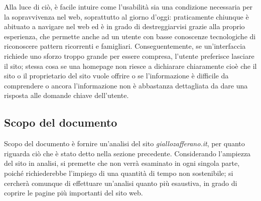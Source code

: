 Alla luce di ciò, è facile intuire come l'usabilità sia una condizione necessaria per la sopravvivenza nel web, soprattutto al giorno d'oggi: praticamente chiunque è abituato a navigare nel web ed è in grado di destreggiarvisi grazie alla proprio esperienza, che permette anche ad un utente con basse conoscenze tecnologiche di riconoscere pattern ricorrenti e famigliari. Conseguentemente, se un'interfaccia richiede uno sforzo troppo grande per essere compresa, l'utente preferisce lasciare il sito; stessa cosa se una homepage non riesce a dichiarare chiaramente cioè che il sito o il proprietario del sito vuole offrire o se l'informazione è difficile da comprendere o ancora l'informazione non è abbastanza dettagliata da dare una risposta alle domande chiave dell'utente. 

\subsection{Scopo del documento}
Scopo del documento è fornire un'analisi del sito \textit{giallozafferano.it}, per quanto riguarda ciò che è stato detto nella sezione precedente.
Considerando l'ampiezza del sito in analisi, si premette che non verrà esaminato in ogni singola parte, poiché richiederebbe l'impiego di una quantità di tempo non sostenibile; si cercherà comunque di effettuare un'analisi quanto più esaustiva, in grado di coprire le pagine più importanti del sito web. 
